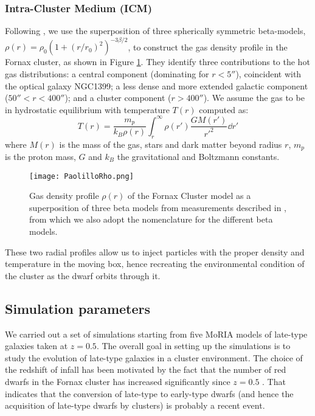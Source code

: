 \subsubsection{Intra-Cluster Medium (ICM)} \label{sec:ICM}
Following \citet{Paolillo2002}, we use the superposition of three spherically symmetric beta-models, $\rho(r) = \rho_0 (1 + (r/r_0)^2 )^{-3\beta/2}$, to construct the gas density profile in the Fornax cluster, as shown in Figure \ref{fig:profiles}.
They identify three contributions to the hot gas distributions: a central component (dominating for $r<5''$), coincident with the optical galaxy NGC1399; a less dense and more extended galactic component ($50''<r<400''$); and a cluster component ($r>400''$).
We assume the gas to be in hydrostatic equilibrium with temperature $T(r)$ computed as:
\begin{equation}
   T(r) = \frac {m_p}{k_B \rho(r)} \int_r^\infty \rho(r') \frac{GM(r')}{r'^2} \dd{r'}
\end{equation}
where $M(r)$ is the mass of the gas, stars and dark matter beyond radius $r$, $m_p$ is the proton mass, $G$ and $k_B$ the gravitational and Boltzmann constants.

\begin{figure}[H]
\centering
\texttt{[image: PaolilloRho.png]}
\caption{Gas density profile $\rho(r)$ of the  Fornax Cluster model as a superposition of three beta models from measurements described in \citet{Paolillo2002}, from which we also adopt the nomenclature for the different beta models.
}
\label{fig:profiles}
\end{figure}

These two radial profiles allow us to inject particles with the proper density and temperature in the moving box, hence recreating the environmental condition of the cluster as the dwarf orbits through it.

\subsection{Simulation parameters}
We carried out a set of simulations starting from five MoRIA models of late-type galaxies taken at $z = 0.5$.
The overall goal in setting up the simulations is to study the evolution of late-type galaxies in a cluster environment.
The choice of the redshift of infall has been motivated by the fact that the number of red dwarfs in the Fornax cluster has increased significantly since $z = 0.5$ \citep{Stott2007, DeRijcke2010}.
That indicates that the conversion of late-type to early-type dwarfs (and hence the acquisition of late-type dwarfs by clusters) is probably a recent event.

